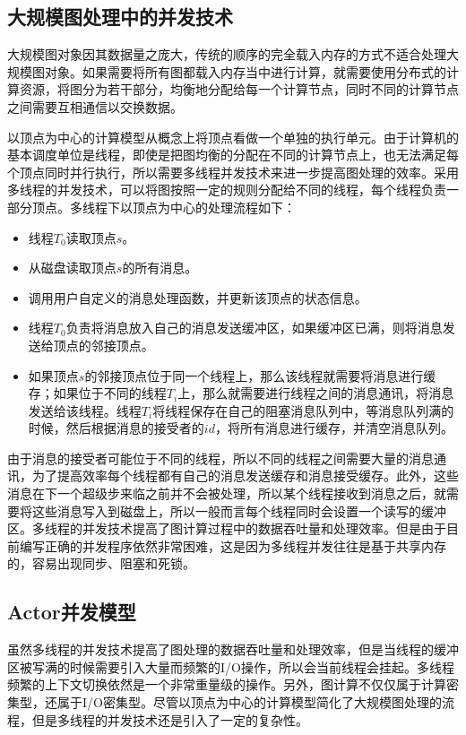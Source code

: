 \subsection{大规模图处理中的并发技术}

大规模图对象因其数据量之庞大，传统的顺序的完全载入内存的方式不适合处理大规模图对象。如果需要将所有图都载入内存当中进行计算，就需要使用分布式的计算资源，将图分为若干部分，均衡地分配给每一个计算节点，同时不同的计算节点之间需要互相通信以交换数据。

以顶点为中心的计算模型从概念上将顶点看做一个单独的执行单元。由于计算机的基本调度单位是线程，即使是把图均衡的分配在不同的计算节点上，也无法满足每个顶点同时并行执行，所以需要多线程并发技术来进一步提高图处理的效率。采用多线程的并发技术，可以将图按照一定的规则分配给不同的线程，每个线程负责一部分顶点。多线程下以顶点为中心的处理流程如下：
\begin{itemize}
\item 线程$T_0$读取顶点$s$。
\item 从磁盘读取顶点$s$的所有消息。
\item 调用用户自定义的消息处理函数，并更新该顶点的状态信息。
\item 线程$T_0$负责将消息放入自己的消息发送缓冲区，如果缓冲区已满，则将消息发送给顶点的邻接顶点。
\item 如果顶点$s$的邻接顶点位于同一个线程上，那么该线程就需要将消息进行缓存；如果位于不同的线程$T_i$上，那么就需要进行线程之间的消息通讯，将消息发送给该线程。线程$T_i$将线程保存在自己的阻塞消息队列中，等消息队列满的时候，然后根据消息的接受者的$id$，将所有消息进行缓存，并清空消息队列。
\end{itemize}

由于消息的接受者可能位于不同的线程，所以不同的线程之间需要大量的消息通讯，为了提高效率每个线程都有自己的消息发送缓存和消息接受缓存。此外，这些消息在下一个超级步来临之前并不会被处理，所以某个线程接收到消息之后，就需要将这些消息写入到磁盘上，所以一般而言每个线程同时会设置一个读写的缓冲区。多线程的并发技术提高了图计算过程中的数据吞吐量和处理效率。但是由于目前编写正确的并发程序依然非常困难，这是因为多线程并发往往是基于共享内存的，容易出现同步、阻塞和死锁\cite{srinivasan2006thread}。

\subsection{Actor并发模型}

虽然多线程的并发技术提高了图处理的数据吞吐量和处理效率，但是当线程的缓冲区被写满的时候需要引入大量而频繁的I/O操作，所以会当前线程会挂起。多线程频繁的上下文切换依然是一个非常重量级的操作。另外，图计算不仅仅属于计算密集型，还属于I/O密集型。尽管以顶点为中心的计算模型简化了大规模图处理的流程，但是多线程的并发技术还是引入了一定的复杂性。

